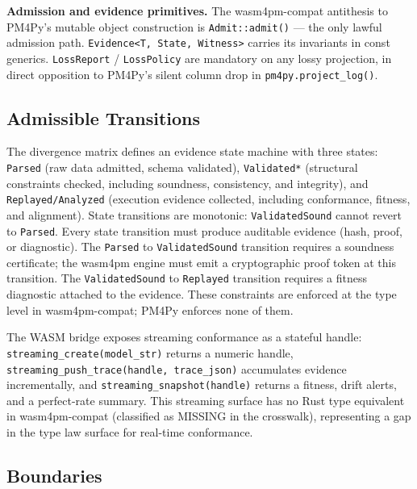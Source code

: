 \textbf{Admission and evidence primitives.} The wasm4pm-compat antithesis to PM4Py's
mutable object construction is \texttt{Admit::admit()} --- the only lawful admission path.
\texttt{Evidence<T, State, Witness>} carries its invariants in const generics.
\texttt{LossReport} / \texttt{LossPolicy} are mandatory on any lossy projection, in direct
opposition to PM4Py's silent column drop in \texttt{pm4py.project\_log()}.

\subsection{Admissible Transitions}
\label{sec:sources-pm4py-arch-transitions}

The divergence matrix defines an evidence state machine with three states:
\texttt{Parsed} (raw data admitted, schema validated),
\texttt{Validated*} (structural constraints checked, including soundness, consistency, and integrity),
and \texttt{Replayed/Analyzed} (execution evidence collected, including conformance,
fitness, and alignment). State transitions are monotonic: \texttt{ValidatedSound} cannot
revert to \texttt{Parsed}. Every state transition must produce auditable evidence (hash,
proof, or diagnostic). The \texttt{Parsed} to \texttt{ValidatedSound} transition requires
a soundness certificate; the wasm4pm engine must emit a cryptographic proof token at this
transition. The \texttt{ValidatedSound} to \texttt{Replayed} transition requires a fitness
diagnostic attached to the evidence. These constraints are enforced at the type level in
wasm4pm-compat; PM4Py enforces none of them.

The WASM bridge exposes streaming conformance as a stateful handle:
\texttt{streaming\_create(model\_str)} returns a numeric handle,
\texttt{streaming\_push\_trace(handle, trace\_json)} accumulates evidence incrementally,
and \texttt{streaming\_snapshot(handle)} returns a fitness, drift alerts, and a
perfect-rate summary. This streaming surface has no Rust type equivalent in wasm4pm-compat
(classified as MISSING in the crosswalk), representing a gap in the type law surface for
real-time conformance.

\subsection{Boundaries}
\label{sec:sources-pm4py-arch-boundaries}

